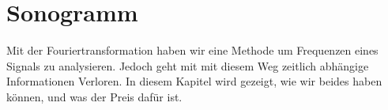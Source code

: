 %
%
%
%
\chapter{Sonogramm\label{chapter:sonogramm}}
\begin{refsection}

Mit der Fouriertransformation haben wir eine Methode um Frequenzen eines Signals zu analysieren.
Jedoch geht mit mit diesem Weg zeitlich abhängige Informationen Verloren.
In diesem Kapitel wird gezeigt, wie wir beides haben können, und was der Preis dafür ist.







\printbibliography[heading=subbibliography]
\end{refsection}
